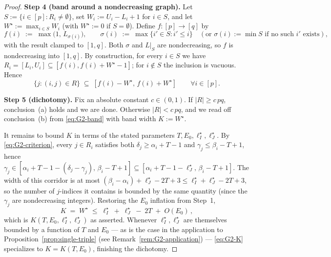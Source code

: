 \begin{proof}
\medskip\noindent\textbf{Step 4 (band around a nondecreasing graph).}
Let $S := \{i\in[p]:R_i\ne\emptyset\}$, set $W_i := U_i-L_i+1$ for $i\in S$, and let
$W^\star := \max_{i\in S} W_i$ (with $W^\star := 0$ if $S=\emptyset$). Define
$f:[p]\to[q]$ by
\[
f(i)\;:=\;\max\!\big(1,\,L_{\sigma(i)}\big),\qquad
\sigma(i)\;:=\;\max\{i'\in S:i'\le i\}\quad(\text{or }\sigma(i):=\min S\text{ if no such }i'\text{ exists}),
\]
with the result clamped to $[1,q]$. Both $\sigma$ and $L\big|_S$ are nondecreasing, so $f$ is
nondecreasing into $[1,q]$. By construction, for every $i\in S$ we have
$R_i=[L_i,U_i]\subseteq[f(i),f(i)+W^\star-1]$; for $i\notin S$ the inclusion is vacuous.
Hence
\begin{equation}\label{eq:G2-band}
\{j:(i,j)\in R\}\;\subseteq\;[f(i)-W^\star,\,f(i)+W^\star]\qquad\forall i\in[p].
\end{equation}

\medskip\noindent\textbf{Step 5 (dichotomy).}
Fix an absolute constant $c\in(0,1)$. If $|R|\ge c\,pq$, conclusion~(a) holds and we are done.
Otherwise $|R|<c\,pq$, and we read off conclusion~(b) from \eqref{eq:G2-band} with band
width $K := W^\star$.

It remains to bound $K$ in terms of the stated parameters $T,E_0,\ell_I^\star,\ell_J^\star$.
By \eqref{eq:G2-criterion}, every $j\in R_i$ satisfies both $\delta_j\ge\alpha_i+T-1$ and
$\gamma_j\le\beta_i-T+1$, hence
$\gamma_j\in[\alpha_i+T-1-(\delta_j-\gamma_j),\,\beta_i-T+1]\subseteq[\alpha_i+T-1-\ell_J^\star,\,\beta_i-T+1]$.
The width of this corridor is at most $(\beta_i-\alpha_i)+\ell_J^\star-2T+3\le\ell_I^\star+\ell_J^\star-2T+3$,
so the number of $j$-indices it contains is bounded by the same quantity (since the
$\gamma_j$ are nondecreasing integers). Restoring the $E_0$ inflation from Step~1,
\begin{equation}\label{eq:G2-K}
K\;=\;W^\star\;\le\;\ell_I^\star\;+\;\ell_J^\star\;-\;2T\;+\;O(E_0)\,,
\end{equation}
which is $K(T,E_0,\ell_I^\star,\ell_J^\star)$ as asserted. Whenever $\ell_I^\star,\ell_J^\star$
are themselves bounded by a function of $T$ and $E_0$ — as is the case in the application to
Proposition~\ref{prop:single-triple} (see Remark~\ref{rem:G2-application}) — \eqref{eq:G2-K}
specializes to $K=K(T,E_0)$, finishing the dichotomy.
\end{proof}

